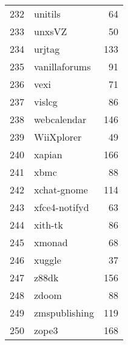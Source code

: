 \begin{table}[!ht]
\begin{tabular}{rlr}
  232 & unitils &  64 \\ 
  233 & unxsVZ &  50 \\ 
  234 & urjtag & 133 \\ 
  235 & vanillaforums &  91 \\ 
  236 & vexi &  71 \\ 
  237 & vislcg &  86 \\ 
  238 & webcalendar & 146 \\ 
  239 & WiiXplorer &  49 \\ 
  240 & xapian & 166 \\ 
  241 & xbmc &  88 \\ 
  242 & xchat-gnome & 114 \\ 
  243 & xfce4-notifyd &  63 \\ 
  244 & xith-tk &  86 \\ 
  245 & xmonad &  68 \\ 
  246 & xuggle &  37 \\ 
  247 & z88dk & 156 \\ 
  248 & zdoom &  88 \\ 
  249 & zmspublishing & 119 \\ 
  250 & zope3 & 168 \\ 
   \hline
\end{tabular}
\end{table}